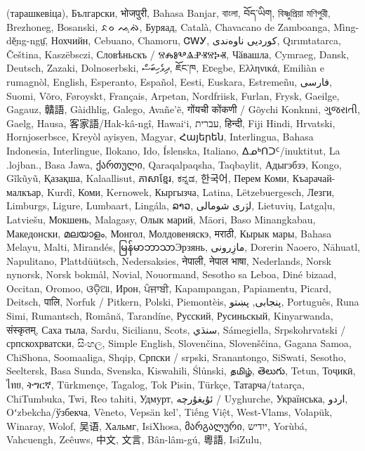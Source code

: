 \begin{itemize}
       (тарашкевіца)‎, Български, भोजपुरी, Bahasa Banjar,
       বাংলা, བོད་ཡིག, বিষ্ণুপ্রিয়া মণিপুরী, Brezhoneg, Bosanski, ᨅᨔ ᨕᨘᨁᨗ, Буряад,
       Català, Chavacano de Zamboanga, Mìng-dĕ̤ng-ngṳ̄, Нохчийн, Cebuano,
       Chamoru, ᏣᎳᎩ, کوردیی ناوەندی, Qırımtatarca, Čeština, Kaszëbsczi,
       Словѣньскъ / ⰔⰎⰑⰂⰡⰐⰠⰔⰍⰟ, Чӑвашла, Cymraeg, Dansk, Deutsch,
       Zazaki, Dolnoserbski, ދިވެހިބަސް, ཇོང་ཁ, Eʋegbe, Ελληνικά, Emiliàn e
       rumagnòl, English, Esperanto, Español, Eesti, Euskara, Estremeñu, فارسی,
       Suomi, Võro, Føroyskt, Français, Arpetan, Nordfriisk, Furlan, Frysk,
       Gaeilge, Gagauz, 贛語, Gàidhlig, Galego, Avañe'ẽ, गोंयची कोंकणी / Gõychi
       Konknni, ગુજરાતી, Gaelg, Hausa, 客家語/Hak-kâ-ngî, Hawai`i, עברית, हिन्दी,
       Fiji Hindi, Hrvatski, Hornjoserbsce, Kreyòl ayisyen, Magyar, Հայերեն,
       Interlingua, Bahasa Indonesia, Interlingue, Ilokano, Ido, Íslenska,
       Italiano, ᐃᓄᒃᑎᑐᑦ/inuktitut, La .lojban., Basa Jawa, ქართული,
       Qaraqalpaqsha, Taqbaylit, Адыгэбзэ, Kongo, Gĩkũyũ, Қазақша,
       Kalaallisut, ភាសាខ្មែរ, ಕನ್ನಡ, 한국어, Перем Коми,
       Къарачай-малкъар, Kurdî, Коми, Kernowek,
       Кыргызча, Latina, Lëtzebuergesch, Лезги, Limburgs, Ligure,
       Lumbaart, Lingála, ລາວ, لۊری شومالی, Lietuvių, Latgaļu, Latviešu,
       Мокшень, Malagasy, Олык марий, Māori, Baso Minangkabau,
       Македонски, മലയാളം, Монгол, Молдовеняскэ,
       मराठी, Кырык мары, Bahasa Melayu, Malti, Mirandés,
       မြန်မာဘာသာЭрзянь, مازِرونی, Dorerin Naoero, Nāhuatl, Napulitano,
       Plattdüütsch, Nedersaksies, नेपाली, नेपाल भाषा, Nederlands, Norsk nynorsk,
       Norsk bokmål, Novial, Nouormand, Sesotho sa Leboa, Diné bizaad, Occitan,
       Oromoo, ଓଡ଼ିଆ, Ирон, ਪੰਜਾਬੀ, Kapampangan, Papiamentu, Picard, Deitsch,
       पालि, Norfuk / Pitkern, Polski, Piemontèis, پنجابی, پښتو, Português, Runa
       Simi, Rumantsch, Română, Tarandíne, Русский, Русиньскый,
       Kinyarwanda, संस्कृतम्, Саха тыла, Sardu, Sicilianu, Scots, سنڌي,
       Sámegiella, Srpskohrvatski / српскохрватски, සිංහල, Simple
       English, Slovenčina, Slovenščina, Gagana Samoa, ChiShona, Soomaaliga,
       Shqip, Српски / srpski, Sranantongo, SiSwati, Sesotho, Seeltersk,
       Basa Sunda, Svenska, Kiswahili, Ślůnski, தமிழ், తెలుగు, Tetun, Тоҷикӣ,
       ไทย, ትግርኛ, Türkmençe, Tagalog, Tok Pisin, Türkçe, Татарча/tatarça,
       ChiTumbuka, Twi, Reo tahiti, Удмурт, ئۇيغۇرچە / Uyghurche,
       Українська, اردو, Oʻzbekcha/ўзбекча, Vèneto, Vepsän kel’,
       Tiếng Việt, West-Vlams, Volapük, Winaray, Wolof, 吴语, Хальмг,
       IsiXhosa, მარგალური, ייִדיש, Yorùbá, Vahcuengh, Zeêuws, 中文, 文言,
       Bân-lâm-gú, 粵語, IsiZulu,
\end{itemize}

